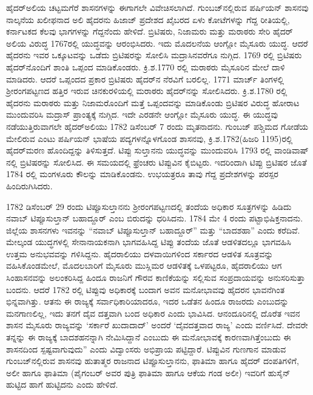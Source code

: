 ಹೈದರ್​ಅಲಿಯ ಚಟ್ಟಮಗೆರೆ ಶಾಸನಗಳನ್ನು ಈಗಾಗಲೇ ವಿವೇಚಿಸಲಾಗಿದೆ. ಗುಂಬಜ್​ನಲ್ಲಿರುವ ಪರ್ಷಿಯನ್​ ಶಾಸನವು ನಾಲ್ಕನೆಯ ಖಲೀಫನಾದ ಅಲಿ ಹೈದರನು ಹಿಜಾಜ್​ ಪ್ರದೇಶದ ಖೈಬರದ ಏಳು ಕೋಟೆಗಳನ್ನು ಗೆದ್ದ ರೀತಿಯಲ್ಲಿ, ಕರ್ನಾಟಕದ ಕೆಲವು ಭಾಗಗಳನ್ನು ಗೆದ್ದನೆಂದು ಹೇಳಿದೆ. ಬ್ರಿಟಿಷರು, ನಿಜಾಮರು ಮತ್ತು ಮರಾಠರು ಸೇರಿ ಹೈದರ್​ ಅಲಿಯ ವಿರುದ್ಧ 1767ರಲ್ಲಿ ಯುದ್ಧವನ್ನು ಆರಂಭಿಸಿದರು. ಇದು ಮೊದಲನೆಯ ಆಂಗ್ಲೋ ಮೈಸೂರು ಯುದ್ಧ. ಆದರೆ ಹೈದರನು ಇವರ ಒಕ್ಕೂಟವನ್ನು ಒಡೆದು ಬ್ರಿಟಿಷರನ್ನು ಸೋಲಿಸಿ ಮದ್ರಾಸಿನವರೆಗೂ ನುಗ್ಗಿದ. 1769 ರಲ್ಲಿ ಬ್ರಿಟಿಷರು ಹೈದರ್​ನೊಂದಿಗೆ ಶಾಂತಿ ಒಪ್ಪಂದ ಮಾಡಿಕೊಂಡರು. ಕ್ರಿ.ಶ.1770 ರಲ್ಲಿ ಮರಾಠರು ಮೈಸೂರಿನ ಮೇಲೆ ದಾಳಿ ಮಾಡಿದರು. ಆದರೆ ಒಪ್ಪಂದದ ಪ್ರಕಾರ ಬ್ರಿಟಿಷರು ಹೈದರ್​ನ ನೆರವಿಗೆ ಬರಲಿಲ್ಲ. 1771 ಮಾರ್ಚ್ ತಿಂಗಳಲ್ಲಿ ಶ‍್ರೀರಂಗಪಟ್ಟಣದ ಹತ್ತಿರ ಇರುವ ಚಿನಕುರಳಿಯಲ್ಲಿ ಮರಾಠರು ಹೈದರ್​ನನ್ನು ಸೋಲಿಸಿದರು. ಕ್ರಿ.ಶ.1780 ರಲ್ಲಿ ಹೈದರನು ಮರಾಠರು ಮತ್ತು ನಿಜಾಮರೊಂದಿಗೆ ಮತ್ತೆ ಒಪ್ಪಂದವನ್ನು ಮಾಡಿಕೊಂಡು ಬ್ರಿಟಿಷರ ವಿರುದ್ಧ ಹೋರಾಟ ಮುಂದುವರಿಸಿ ಮದ್ರಾಸ್​ ಪ್ರಾಂತ್ಯಕ್ಕೆ ನುಗ್ಗಿದ. ಇದೇ ಎರಡನೇ ಆಂಗ್ಲೋ ಮೈಸೂರು ಯುದ್ಧ. ಈ ಯುದ್ಧವು ನಡೆಯುತ್ತಿರುವಾಗಲೇ ಹೈದರ್​ಅಲಿಯು 1782 ಡಿಸೆಂಬರ್​ 7 ರಂದು ಮೃತನಾದನು. ಗುಂಬಜ್​ ಪಶ್ಚಿಮದ ಗೋಡೆಯ ಮೇಲಿರುವ ಎಂಟು ಪರ್ಷಿಯನ್​ ಭಾಷೆಯ ಪದ್ಯಗಳನ್ನೊಳಗೊಂಡ ಶಾಸನವು, ಕ್ರಿ.ಶ.1782(ಹಿಜರಿ 1195)ರಲ್ಲಿ ಹೈದರ್​ ಮರಣ ಹೊಂದಿದ್ದನ್ನು ತಿಳಿಸುತ್ತದೆ. ಟಿಪ್ಪು ಸುಲ್ತಾನನು ಯುದ್ಧವನ್ನು ಮುಂದುವರಿಸಿ 1793 ರಲ್ಲಿ ವಾಂಡಿವಾಷ್​ನಲ್ಲಿ ಬ್ರಿಟಿಷರನ್ನು ಸೋಲಿಸಿದ. ಈ ಸಮಯದಲ್ಲಿ ಫ್ರೆಂಚರು ಟಿಪ್ಪುವಿನ ಕೈಬಿಟ್ಟರು. ಇದರಿಂದಾಗಿ ಟಿಪ್ಪು ಬ್ರಿಟಿಷರ ಜೊತೆ 1784 ರಲ್ಲಿ ಮಂಗಳೂರು ಕೌಲನ್ನು ಮಾಡಿಕೊಂಡನು. ಉಭಯತ್ರರೂ ತಾವು ಗೆದ್ದ ಪ್ರದೇಶಗಳನ್ನು ಪರಸ್ಪರ ಹಿಂದಿರುಗಿಸಿದರು. 

1782 ಡಿಸೆಂಬರ್​ 29 ರಂದು ಟಿಪ್ಪೂಸುಲ್ತಾನನು ಶ‍್ರೀರಂಗಪಟ್ಟಣದಲ್ಲಿ ತಂದೆಯ ಅಧಿಕಾರ ಸೂತ್ರಗಳನ್ನು ಹಿಡಿದು ನವಾಬ್​ ಟಿಪ್ಪೂಸುಲ್ತಾನ್​ ಬಹಾದ್ದೂರ್​ ಎಂಬ ಬಿರುದನ್ನು ಧರಿಸಿದನು. 1784 ಮೇ 4 ರಂದು ಪಟ್ಟಾಭಿಷಿಕ್ತನಾದನು. ಜಿಲ್ಲೆಯ ಶಾಸನಗಳು ಇವನನ್ನು “ನವಾಬ್​ ಟಿಪ್ಪೂಸುಲ್ತಾನ್​ ಬಹಾದ್ದೂರ್​” ಮತ್ತು “ಬಾದಶಹಾ” ಎಂದು ಕರೆದಿವೆ. ಮೇಲ್ಕಂಡ ಯುದ್ಧಗಳಲ್ಲಿ ಸೇನಾನಾಯಕನಾಗಿ ಭಾಗವಹಿಸಿದ್ದ ಟಿಪ್ಪು ತಂದೆಯ ಜೊತೆ ಆಡಳಿತದಲ್ಲೂ ಭಾಗವಹಿಸಿ ಉತ್ತಮ ಅನುಭವವನ್ನು ಗಳಿಸಿದ್ದನು. ಹೈದರಾಲಿಯು ದಳವಾಯಿಗಳಿಂದ ಸರ್ಕಾರದ ಆಡಳಿತ ಸೂತ್ರವನ್ನು ವಹಿಸಿಕೊಂಡಮೇಲೆ, ಮೊದಲಬಾರಿಗೆ ಮೈಸೂರು ಮುಸ್ಲಿಮರ ಆಡಳಿತಕ್ಕೆ ಒಳಪಟ್ಟರೂ, ಹೈದರಾಲಿಯು ಆಗ ಸಿಂಹಾಸನವನ್ನು ಅಲಂಕರಿಸಿದ್ದ ಹಿಂದೂ ರಾಜನಿಗೆ ಗೌರವ ಕಾಣಿಕೆಯನ್ನು ಸಲ್ಲಿಸುವ ಸಂಪ್ರದಾಯವನ್ನು ಅನುಸರಿಸುತ್ತಾ ಬಂದನು. ಆದರೆ 1782 ರಲ್ಲಿ ಟಿಪ್ಪುವು ಅಧಿಕಾರಕ್ಕೆ ಬಂದಾಗ ಅವನ ಮನೋಭಾವವು ಹೈದರನ ಭಾವನೆಗಿಂತ ಭಿನ್ನವಾಗಿತ್ತು. ಆತನು ಈ ರಾಜ್ಯಕ್ಕೆ ಸರ್ವಾಧಿಕಾರಿಯಾದರೂ, ಇದರ ಒಡೆತನ ಹಿಂದೂ ರಾಜರದು ಎಂಬುದನ್ನು ಮನಗಾಣಲಿಲ್ಲ, ಇದು ತನಗೆ ದೈವ ದತ್ತವಾಗಿ ಬಂದ ಅಧಿಕಾರ ಎಂದು ಭಾವಿಸಿದ. ಆನಂದೂರಿನಲ್ಲಿ ದೊರೆತ ಇವನ ಶಾಸನ ಮೈಸೂರು ರಾಜ್ಯವನ್ನು ‘ಸರ್ಕಾರೆ ಖುದಾದಾದ್​’ ಅಂದರೆ ‘ದೈವದತ್ತವಾದ ರಾಜ್ಯ’ ಎಂದು ವರ್ಣಿಸಿದೆ. ದೇವರೇ ತನ್ನನ್ನು ಈ ರಾಜ್ಯಕ್ಕೆ ಬಾದಶಹನನ್ನಾಗಿ ನೇಮಿಸಿದ್ದಾನೆ ಎಂಬುದು ಈ ಮನೋಭಾವಕ್ಕೆ ಕಾರಣವಾಗಿತ್ತೆಂಬುದು ಈ ಶಾಸನದಿಂದ ಸ್ಪಷ್ಟವಾಗುವುದು” ಎಂದು ವಿದ್ವಾಂಸರು ಅಭಿಪ್ರಾಯ ಪಟ್ಟಿದ್ದಾರೆ. ಟಿಪ್ಪುವಿನ ಗುಣಗಾನ ಮಾಡುವ ಗುಂಬಜ್​ನಲ್ಲಿರುವ ಶಾಸನವು ಹುತಾತ್ಮರ ರಾಜನಾದ ಟಿಪ್ಪೂಸುಲ್ತಾನನು, ಫಾತಿಮಾ ಹಾಗೂ ಹೈದರ್​ ದಂಪತಿಗಳಿಗೆ, ಅಲೀ ಹಾಗೂ ಫಾತಿಮಾ (ಪೈಗಂಬರ್​ ಅವರ ಪುತ್ರಿ ಫಾತಿಮಾ ಹಾಗೂ ಆಕೆಯ ಗಂಡ ಅಲೀ) ಇವರಿಗೆ ಹುಸೈನ್​ ಹುಟ್ಟಿದ ಹಾಗೆ ಹುಟ್ಟಿದನು ಎಂದು ಹೇಳಿದೆ.

